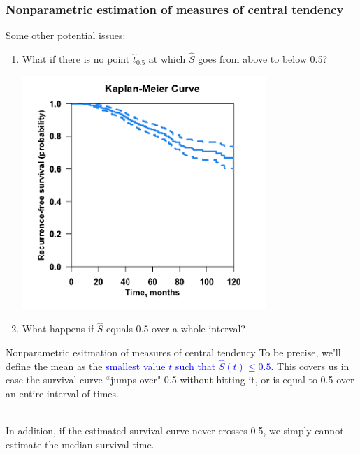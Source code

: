 \documentclass[10pt,t]{beamer}
\begin{document}
\begin{frame}
\frametitle{Nonparametric estimation of measures of central tendency}
Some other potential issues: 
\begin{enumerate}
\item What if there is no point $\hat{t}_{0.5}$ at which $\widehat{S}$ goes from above to below 0.5?
\begin{center}
	\includegraphics[width=0.6\textheight]{figs/no_median.png}
\end{center}
\item What happens if $\widehat{S}$ equals 0.5 over a whole interval?
\end{enumerate}

\end{frame}


\begin{frame}{Nonparametric esitmation of measures of central tendency}
	To be precise, we'll define the mean as the \textcolor{blue}{smallest value $t$ such that $\widehat{S}(t) \leq 0.5$}. This covers us in case the survival curve ``jumps over" 0.5 without hitting it, or is equal to 0.5 over an entire interval of times. 
	\\ ~\ 
	
	In addition, if the estimated survival curve never crosses 0.5, we simply cannot estimate the median survival time. 
\end{frame}
\end{document}
